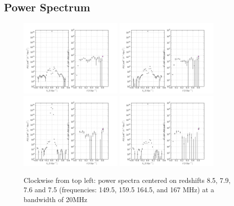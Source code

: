\documentclass[preprint]{aastex}
\begin{document}

\subsection{Power Spectrum}
\begin{figure}
\centering
\includegraphics[width=0.45\textwidth]{figures/pspec_Mar24_psa32_zbins_1_80_119_I.png}
\includegraphics[width=0.45\textwidth]{figures/pspec_Mar24_psa32_zbins_1_100_139_I.png}
\includegraphics[width=0.45\textwidth]{figures/pspec_Mar24_psa32_zbins_1_110_149_I.png}
\includegraphics[width=0.45\textwidth]{figures/pspec_Mar24_psa32_zbins_1_119_150_I.png}
\caption{\label{fig:pspecs} Clockwise from top left: power spectra centered on redshifts 8.5, 7.9, 7.6 and 7.5 (frequencies: 149.5, 159.5 164.5, and 167 MHz) at a bandwidth of 20MHz}
\end{figure}
\end{document}
